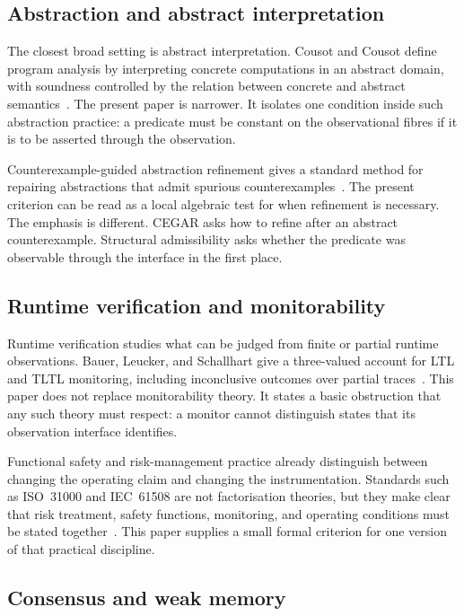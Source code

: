 \documentclass[a4paper,11pt]{article}
\begin{document}
\subsection{Abstraction and abstract interpretation}

The closest broad setting is abstract interpretation. Cousot and Cousot define
program analysis by interpreting concrete computations in an abstract domain,
with soundness controlled by the relation between concrete and abstract
semantics~\cite{cousot1977abstract}. The present paper is narrower. It isolates
one condition inside such abstraction practice: a predicate must be constant on
the observational fibres if it is to be asserted through the observation.

Counterexample-guided abstraction refinement gives a standard method for
repairing abstractions that admit spurious counterexamples~\cite{clarke2000cegar,clarke2003cegar}.
The present criterion can be read as a local algebraic test for when refinement
is necessary. The emphasis is different. CEGAR asks how to refine after an
abstract counterexample. Structural admissibility asks whether the predicate was
observable through the interface in the first place.

\subsection{Runtime verification and monitorability}

Runtime verification studies what can be judged from finite or partial runtime
observations. Bauer, Leucker, and Schallhart give a three-valued account for LTL
and TLTL monitoring, including inconclusive outcomes over partial traces~\cite{bauer2011runtime}.
This paper does not replace monitorability theory. It states a basic obstruction
that any such theory must respect: a monitor cannot distinguish states that its
observation interface identifies.

Functional safety and risk-management practice already distinguish between
changing the operating claim and changing the instrumentation. Standards such
as ISO~31000 and IEC~61508 are not factorisation theories, but they make clear
that risk treatment, safety functions, monitoring, and operating conditions must
be stated together~\cite{iso31000,iec61508}. This paper supplies a small formal
criterion for one version of that practical discipline.

\subsection{Consensus and weak memory}
\end{document}
